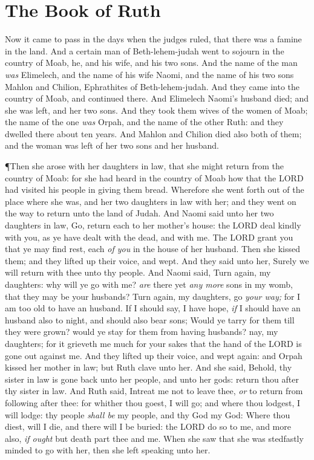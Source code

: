 \documentclass[11pt,letterpaper,oneside]{memoir}
\begin{document}
\chapter[Ruth]{The Book of Ruth}

Now it came to pass in the days when the judges ruled, that there was
a famine in the land. And a certain man of Beth-lehem-judah went to
sojourn in the country of Moab, he, and his wife, and his two sons.
And the name of the man \emph{was} Elimelech, and the name of his wife
Naomi, and the name of his two sons Mahlon and Chilion, Ephrathites of
Beth-lehem-judah. And they came into the country of Moab, and
continued there.  And Elimelech Naomi's husband died; and she was
left, and her two sons.  And they took them wives of the women of
Moab; the name of the one \emph{was} Orpah, and the name of the other
Ruth: and they dwelled there about ten years.  And Mahlon and Chilion
died also both of them; and the woman was left of her two sons and her
husband.

\P Then she arose with her daughters in law, that she might return
from the country of Moab: for she had heard in the country of Moab how
that the \textsc{LORD} had visited his people in giving them bread.
Wherefore she went forth out of the place where she was, and her two
daughters in law with her; and they went on the way to return unto the
land of Judah.  And Naomi said unto her two daughters in law, Go,
return each to her mother's house: the \textsc{LORD} deal kindly with
you, as ye have dealt with the dead, and with me.  The \textsc{LORD}
grant you that ye may find rest, each \emph{of you} in the house of
her husband. Then she kissed them; and they lifted up their voice, and
wept.  And they said unto her, Surely we will return with thee unto
thy people.  And Naomi said, Turn again, my daughters: why will ye go
with me? \emph{are} there yet \emph{any more} sons in my womb, that
they may be your husbands?  Turn again, my daughters, go \emph{your
way;} for I am too old to have an husband. If I should say, I have
hope, \emph{if} I should have an husband also to night, and should
also bear sons;  Would ye tarry for them till they were grown? would
ye stay for them from having husbands? nay, my daughters; for it
grieveth me much for your sakes that the hand of the \textsc{LORD} is
gone out against me.  And they lifted up their voice, and wept again:
and Orpah kissed her mother in law; but Ruth clave unto her.  And she
said, Behold, thy sister in law is gone back unto her people, and unto
her gods: return thou after thy sister in law.  And Ruth said, Intreat
me not to leave thee, \emph{or} to return from following after thee:
for whither thou goest, I will go; and where thou lodgest, I will
lodge: thy people \emph{shall be} my people, and thy God my God:
Where thou diest, will I die, and there will I be buried: the
\textsc{LORD} do so to me, and more also, \emph{if ought} but death
part thee and me.  When she saw that she was stedfastly minded to go
with her, then she left speaking unto her.
\end{document}

